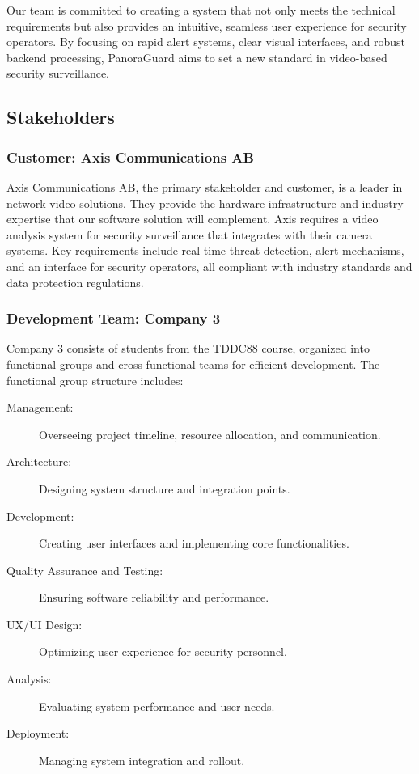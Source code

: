 Our team is committed to creating a system that not only meets the technical requirements but also provides an intuitive, seamless user experience for security operators. By focusing on rapid alert systems, clear visual interfaces, and robust backend processing, PanoraGuard aims to set a new standard in video-based security surveillance.
    
\subsection{Stakeholders}
    
\subsubsection{Customer: Axis Communications AB}
Axis Communications AB, the primary stakeholder and customer, is a leader in network video solutions. They provide the hardware infrastructure and industry expertise that our software solution will complement. Axis requires a video analysis system for security surveillance that integrates with their camera systems. Key requirements include real-time threat detection, alert mechanisms, and an interface for security operators, all compliant with industry standards and data protection regulations.
    
\subsubsection{Development Team: Company 3}
Company 3 consists of students from the TDDC88 course, organized into functional groups and cross-functional teams for efficient development. The functional group structure includes:
    
\begin{description}
    \item[Management:] Overseeing project timeline, resource allocation, and communication.
    \item[Architecture:] Designing system structure and integration points.
    \item[Development:] Creating user interfaces and implementing core functionalities.
    \item[Quality Assurance and Testing:] Ensuring software reliability and performance.
    \item[UX/UI Design:] Optimizing user experience for security personnel.
    \item[Analysis:] Evaluating system performance and user needs.
    \item[Deployment:] Managing system integration and rollout. 
\end{description}
    
